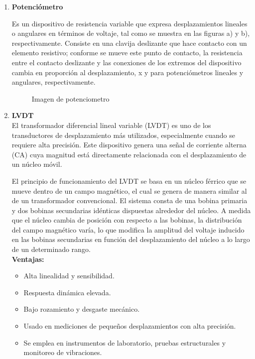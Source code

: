 \begin{enumerate}
\begin{enumerate}
\begin{enumerate}
					\item \textbf{Potenciómetro}
					 
					Es un dispositivo de resistencia variable que expresa desplazamientos lineales o angulares en términos de voltaje, tal como se muestra en las figuras a) y b), respectivamente. Consiste en una clavija deslizante que hace contacto con un elemento resistivo; conforme se mueve este punto de contacto, la resistencia entre el contacto deslizante y las conexiones de los extremos del dispositivo cambia en proporción al desplazamiento, x y  para potenciómetros lineales
					y angulares, respectivamente. \cite{saha2010robotics}
					
				\begin{figure}[h]
					\centering
					\hfill
					\caption{Imagen de potenciometro}
					\label{fig:mascotas}
				\end{figure}

\vspace{60mm}
			\item \textbf{LVDT}
			\\
		El transformador diferencial lineal variable (LVDT) es uno de los transductores de desplazamiento más utilizados, especialmente cuando se requiere alta precisión. Este dispositivo genera una señal de corriente alterna (CA) cuya magnitud está directamente relacionada con el desplazamiento de un núcleo móvil.
		
		El principio de funcionamiento del LVDT se basa en un núcleo férrico que se mueve dentro de un campo magnético, el cual se genera de manera similar al de un transformador convencional. El sistema consta de una bobina primaria y dos bobinas secundarias idénticas dispuestas alrededor del núcleo. A medida que el núcleo cambia de posición con respecto a las bobinas, la distribución del campo magnético varía, lo que modifica la amplitud del voltaje inducido en las bobinas secundarias en función del desplazamiento del núcleo a lo largo de un determinado rango.\cite{saha2010robotics}
		\\
		
		\textbf{Ventajas:}
		\begin{itemize}
			\item Alta linealidad y sensibilidad.
			\item Respuesta dinámica elevada.
			\item Bajo rozamiento y desgaste mecánico.
			\item Usado en mediciones de pequeños desplazamientos con alta precisión.
			\item Se emplea en instrumentos de laboratorio, pruebas estructurales y monitoreo de vibraciones.
		\end{itemize}
		

\end{enumerate}
\end{enumerate}
\end{enumerate}
